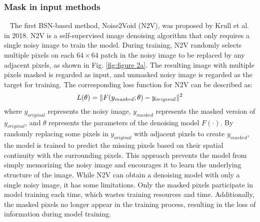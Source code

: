 \documentclass[conference]{IEEEtran}
\begin{document}
\subsubsection{Mask in input methods}
\
\newline
\noindent The first BSN-based method, Noise2Void (N2V), was proposed by Krull et al. \cite{krull2019noise2void} in 2018. N2V is a self-supervised image denoising algorithm that only requires a single noisy image to train the model. During training, N2V randomly selects multiple pixels on each $64\times64$ patch in the noisy image to be replaced by any adjacent pixels, as shown in Fig. \ref{fig:figure 2a}. The resulting image with multiple pixels masked is regarded as input, and unmasked noisy image is regarded as the target for training. The corresponding loss function for N2V can be described as:
\begin{equation}
	\setlength{\abovedisplayskip}{0pt}
	\setlength{\belowdisplayskip}{0pt}
	L(\theta) = \Vert F(y_{masked};\theta) - y_{original} \Vert^2
	\label{eq:N2V}
\end{equation}
where $y_{original}$ represents the noisy image, $y_{masked}$ represents the masked version of $y_{original}$, and $\theta$ represents the parameters of the denoising model $F(\cdot)$. By randomly replacing some pixels in $y_{original}$ with adjacent pixels to create $y_{masked}$, the model is trained to predict the missing pixels based on their spatial continuity with the surrounding pixels. This approach prevents the model from simply memorizing the noisy image and encourages it to learn the underlying structure of the image. 
While N2V can obtain a denoising model with only a single noisy image, it has some limitations. Only the masked pixels participate in model training each time, which wastes training resources and time. Additionally, the masked pixels no longer appear in the training process, resulting in the loss of information during model training.
\end{document}
